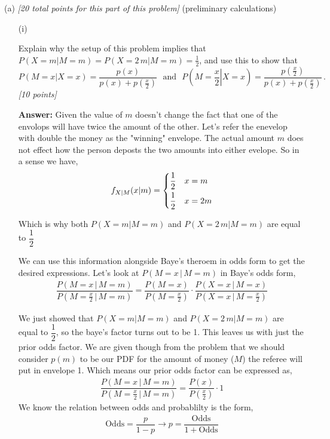 \documentclass[12pt]{article}
\newcommand{\given}{\, | \,}
\begin{document}
(a) \textit{[20 total points for this part of this problem]} (preliminary calculations)

\begin{itemize}

\item[(i)]

Explain why the setup of this problem implies that
$P ( X = m | M = m ) = P ( X = 2 \, m | M = m ) = \frac{ 1 }{ 2 }$, and use
this to show that
\begin{equation} \label{e:calculation-1}
P ( M = x | X = x ) = \frac{ p ( x ) }{ p ( x ) + p \! \left( \frac{ x }{
2 } \right) } \ \ \ \mbox{and} \ \ \ P \! \left( M = \left. \frac{ x }{ 2
} \right| X = x \right) = \frac{ p \! \left( \frac{ x }{ 2 } \right) }{ p
( x ) + p \! \left( \frac{ x }{ 2 } \right) } \, .
\end{equation}
\textit{[10 points]}

{\bf Answer:}  Given the value of $m$ doesn't change the fact that one of the envolops will have twice the amount of the other. Let's refer the enevelop with double the money as the "winning" envelope. The actual amount $m$ does not effect how the person deposts the two amounts into either evelope. So in a sense we have,
\begin{align*}
    f_{X|M}(x|m) = \begin{dcases}\dfrac{1}{2} & x = m \\ \dfrac{1}{2} & x = 2m\end{dcases}
\end{align*}

Which is why both $P ( X = m | M = m )$ and $P ( X = 2 \, m | M = m )$ are equal to $\dfrac{1}{2}$

We can use this information alongside Baye's theroem in odds form to get the desired expressions. Let's look at $P(M = x \given M = m)$ in Baye's odds form,
\begin{align*}
    \dfrac{P(M = x \given M = m)}{P(M = \frac{x}{2} \given M = m)} = \dfrac{P(M=x)}{P(M=\frac{x}{2})} \cdot \dfrac{P(X=x\given M = x)}{P(X=x\given M = \frac{x}{2})}
\end{align*}

We just showed that $P ( X = m | M = m )$ and $P ( X = 2 \, m | M = m )$ are equal to $\dfrac{1}{2}$, so the baye's factor turns out to be 1. This leaves us with just the prior odds factor. We are given though from the problem that we should consider $p(m)$ to be our PDF for the amount of money ($M$) the referee will put in envelope 1. Which means our prior odds factor can be expressed as,
\begin{align*}
    \dfrac{P(M = x \given M = m)}{P(M = \frac{x}{2} \given M = m)} = \dfrac{P(x)}{P(\frac{x}{2})} \cdot 1
\end{align*}
We know the relation between odds and probablilty is the form,
\begin{align*}
    \text{Odds} = \dfrac{p}{1-p} \rightarrow p = \dfrac{\text{Odds}}{1 + \text{Odds}}
\end{align*}


\end{itemize}
\end{document}
